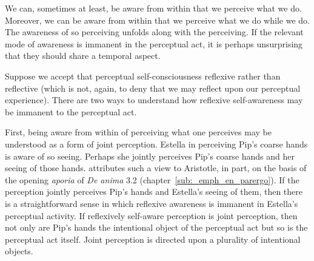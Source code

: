 We can, sometimes at least, be aware from within that we perceive what we do. Moreover, we can be aware from within that we perceive what we do while we do. The awareness of so perceiving unfolds along with the perceiving. If the relevant mode of awareness is immanent in the perceptual act, it is perhaps unsurprising that they should share a temporal aspect.

Suppose we accept that perceptual self-consciousness reflexive rather than reflective (which is not, again, to deny that we may reflect upon our perceptual experience). There are two ways to understand how reflexive self-awareness may be immanent to the perceptual act.

First, being aware from within of perceiving what one perceives may be understood as a form of joint perception. Estella in perceiving Pip's coarse hands is aware of so seeing. Perhaps she jointly perceives Pip's coarse hands and her seeing of those hands. \citet{Twomey:2019aa} attributes such a view to Aristotle, in part, on the basis of the opening \emph{aporia} of \emph{De anima} 3.2 (chapter~\ref{sub:_emph_en_parergo}). If the perception jointly perceives Pip's hands and Estella's seeing of them, then there is a straightforward sense in which reflexive awareness is immanent in Estella's perceptual activity. If reflexively self-aware perception is joint perception, then not only are Pip's hands the intentional object of the perceptual act but so is the perceptual act itself. Joint perception is directed upon a plurality of intentional objects.

